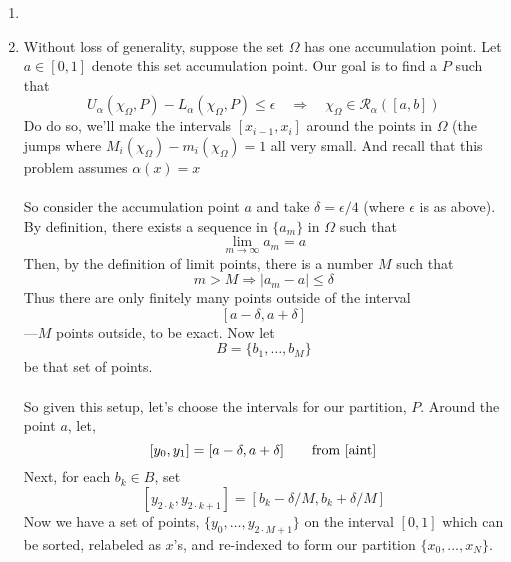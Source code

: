 \documentclass[12pt]{article}
\theoremstyle{plain}
\theoremstyle{definition}
\theoremstyle{remark}
\begin{document}
\begin{enumerate}
            
        
\item 


\item Without loss of generality, suppose the set $\Omega$ 
    has one accumulation point. Let 
    $a \in [0,1]$ denote this set 
    accumulation point. Our goal is to find a $P$ such
    that
        \[ U_\alpha(\chi_\Omega, P) - L_\alpha(\chi_\Omega, P) 
            \leq \epsilon \quad \Rightarrow \quad 
            \chi_\Omega \in \mathscr{R}_\alpha([a,b])\]
    Do do so, we'll make the intervals $[x_{i-1}, x_i]$ 
    around the points in $\Omega$ (the jumps where 
    $M_i(\chi_\Omega) - m_i(\chi_\Omega)= 1$ all 
    very small.  
    And recall that this problem assumes $\alpha(x) = x$
    \\
    \\
    So consider the accumulation point $a$ and 
    take $\delta=\epsilon/4$ (where $\epsilon$ is 
    as above). By definition,
    there exists a sequence in $\{a_m\}$ in $\Omega$
    such that 
        \[ \lim_{m\rightarrow \infty} a_m = a \]
    Then, by the definition of limit points, there is
    a number $M$ such that 
        \[ m>M \Rightarrow |a_m - a|\leq \delta \]
    Thus there are only finitely many points 
    outside of the interval 
    \begin{equation} 
        \label{aint}
        [a-\delta, a+\delta]
    \end{equation} 
    ---$M$ points outside, to be exact.
    Now let 
        \[ B = \{b_1, \ldots, b_M\} \]
    be that set of points. 
    \\
    \\
    So given this setup, let's choose the intervals 
    for our partition, $P$.  Around the point $a$, 
    let, 
    \begin{equation}
        \label{istar}
         [y_0, y_1] = [a-\delta, a + \delta]
            \qquad \text{from \ref{aint}} 
    \end{equation}
    Next, for each $b_k \in B$, set 
    \begin{equation}
        \label{bigI}
         [y_{2\cdot k }, y_{2\cdot k+1}] = 
            [b_k - \delta/M, b_k + \delta/M ]
    \end{equation}
    Now we have a set of points, $\{y_0, \ldots, 
    y_{2\cdot M+1}\}$ on the 
    interval $[0,1]$ which can be sorted,
    relabeled as $x$'s, and re-indexed to
    form our partition $\{x_0, \ldots, x_N\}$.
    \\
    \\

\end{enumerate}
\end{document}
